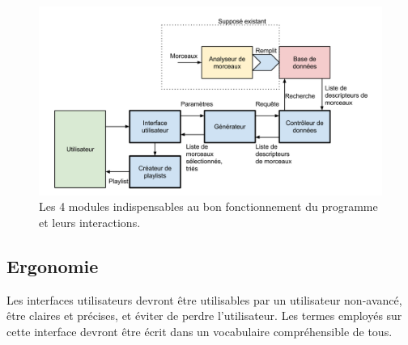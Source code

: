 \begin{figure}[H]
\includegraphics[width=\textwidth]{data/besoins/modules.png}
\caption{Les 4 modules indispensables au bon fonctionnement du programme et leurs
interactions.}
\end{figure}

\subsection{Ergonomie}
\label{besoins:nfonc:perf:erg}
Les interfaces utilisateurs devront être utilisables par un utilisateur
non-avancé, être claires et précises, et éviter de perdre l’utilisateur. Les
termes employés sur cette interface devront être écrit dans un vocabulaire
compréhensible de tous.
